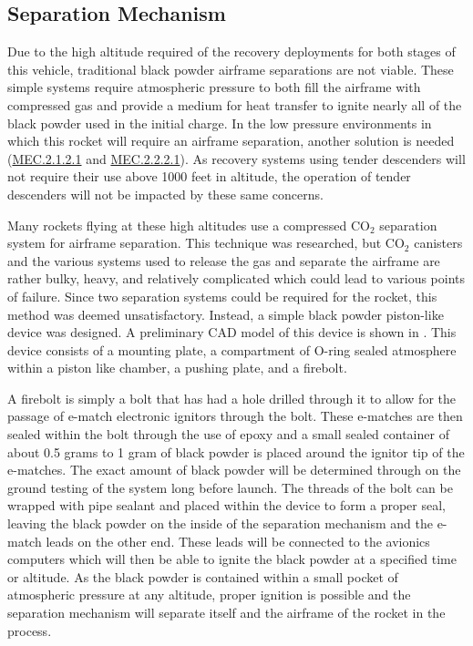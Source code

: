 \subsection{Separation Mechanism} \label{section:sep-mech}
Due to the high altitude required of the recovery deployments for both stages of this vehicle, traditional black powder airframe separations are not viable. These simple systems require atmospheric pressure to both fill the airframe with compressed gas and provide a medium for heat transfer to ignite nearly all of the black powder used in the initial charge. In the low pressure environments in which this rocket will require an airframe separation, another solution is needed (\hyperlink{MEC.2.1.2.1}{MEC.2.1.2.1} and \hyperlink{MEC.2.2.2.1}{MEC.2.2.2.1}). As recovery systems using tender descenders will not require their use above 1000 feet in altitude, the operation of tender descenders will not be impacted by these same concerns. 

Many rockets flying at these high altitudes use a compressed CO\(_2\) separation system for airframe separation. This technique was researched, but CO\(_2\) canisters and the various systems used to release the gas and separate the airframe are rather bulky, heavy, and relatively complicated which could lead to various points of failure. Since two separation systems could be required for the rocket, this method was deemed unsatisfactory. Instead, a simple black powder piston-like device was designed. A preliminary CAD model of this device is shown in . This device consists of a mounting plate, a compartment of O-ring sealed atmosphere within a piston like chamber, a pushing plate, and a firebolt.

A firebolt is simply a bolt that has had a hole drilled through it to allow for the passage of e-match electronic ignitors through the bolt. These e-matches are then sealed within the bolt through the use of epoxy and a small sealed container of  about 0.5 grams to 1 gram of black powder is placed around the ignitor tip of the e-matches. The exact amount of black powder will be determined through on the ground testing of the system long before launch. The threads of the bolt can be wrapped with pipe sealant and placed within the device to form a proper seal, leaving the black powder on the inside of the separation mechanism and the e-match leads on the other end. These leads will be connected to the avionics computers which will then be able to ignite the black powder at a specified time or altitude. As the black powder is contained within a small pocket of atmospheric pressure at any altitude, proper ignition is possible and the separation mechanism will separate itself and the airframe of the rocket in the process.

